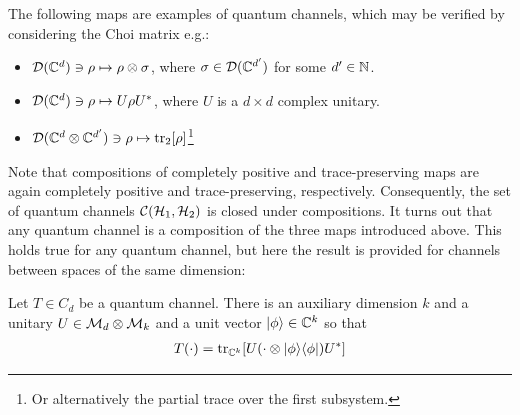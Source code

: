 \begin{ex}The following maps are examples of quantum channels, which may be verified by considering the Choi matrix e.g.:
\begin{itemize}
    \item $\mathcal D(\mathbb{C}^d)\ni\rho \mapsto \rho \otimes \sigma$, where $\sigma \in \mathcal D(\mathbb{C}^{d'})$ for some $d'\in \mathbb{N}$.
    \item $\mathcal D(\mathbb{C}^d)\ni\rho \mapsto U\rho U^*$, where $U$ is a $d\times d$ complex unitary.
    \item $\mathcal D(\mathbb{C}^d\otimes \mathbb{C}^{d'})\ni\rho \mapsto \mathrm{tr}_2[\rho]$\footnote{Or alternatively the partial trace over the first subsystem.}
\end{itemize}
\end{ex}
Note that compositions of completely positive and trace-preserving maps are again completely positive and trace-preserving, respectively. Consequently, the set of quantum channels $\mathcal C(\mathcal{H}_1, \mathcal{H}_2)$ is closed under compositions. It turns out that any quantum channel is a composition of the three maps introduced above. This holds true for any quantum channel, but here the result is provided for channels between spaces of the same dimension:
\begin{theorem}
    Let $T \in C_d$ be a quantum channel. There is an auxiliary dimension $k$ and a unitary $U\in \mathcal M_{d}\otimes \mathcal M_{k}$ and a unit vector $\lvert\phi\rangle \in \mathbb{C}^{k}$ so that
    \begin{align*}
        T(\cdot) = \text{tr}_{\mathbb{C}^k}[U(\cdot \otimes \lvert\phi\rangle\langle\phi\rvert)U^*]
    \end{align*}
\end{theorem}


